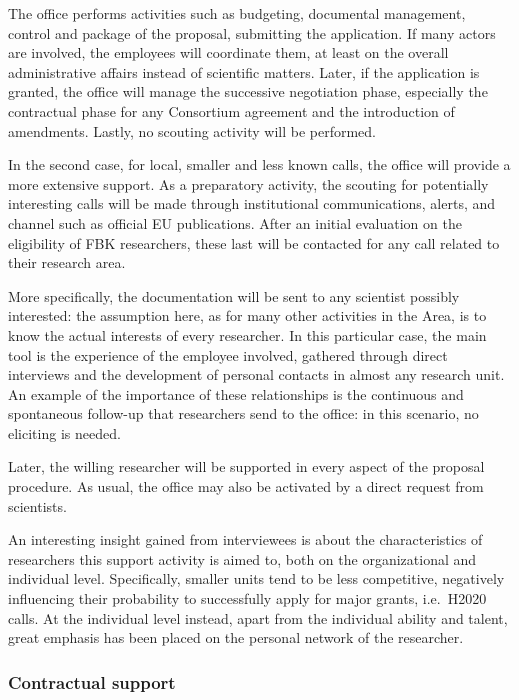 The office performs activities such as budgeting, documental management, control and package of the proposal, submitting the application. If many actors are involved, the employees will coordinate them, at least on the overall administrative affairs instead of scientific matters. Later, if the application is granted, the office will manage the successive negotiation phase, especially the contractual phase for any Consortium agreement and the introduction of amendments. Lastly, no scouting activity will be performed. 

In the second case, for local, smaller and less known calls, the office will provide a more extensive support. As a preparatory activity, the scouting for potentially interesting calls will be made through institutional communications, alerts, and channel such as official EU publications. After an initial evaluation on the eligibility of FBK researchers, these last will be contacted for any call related to their research area. 

More specifically, the documentation will be sent to any scientist possibly interested: the assumption here, as for many other activities in the Area, is to know the actual interests of every researcher. In this particular case, the main tool is the experience of the employee involved, gathered through direct interviews and the development of personal contacts in almost any research unit. An example of the importance of these relationships is the continuous and spontaneous follow-up that researchers send to the office: in this scenario, no eliciting is needed.

Later, the willing researcher will be supported in every aspect of the proposal procedure. As usual,  the office may also be activated by a direct request from scientists. 

An interesting insight gained from interviewees is about the characteristics of researchers this support activity is aimed to, both on the organizational and individual level. Specifically, smaller units tend to be less competitive, negatively influencing their probability to successfully apply for major grants, i.e.\ H2020 calls. At the individual level instead, apart from the individual ability and talent, great emphasis has been placed on the personal network of the researcher. 

\subsubsection{Contractual support}

